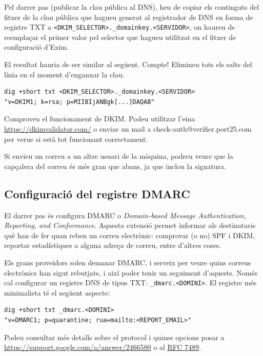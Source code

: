 \documentclass{practicaitic}
\begin{document}
Pel darrer pas (publicar la clau pública al DNS), heu de copiar els continguts
del fitxer de la clau pública que hagueu generat al registrador de DNS en
forma de registre TXT a \texttt{<DKIM\_SELECTOR>.\_domainkey.<SERVIDOR>}, on 
haureu de reemplaçar el primer valor pel selector que hagueu utilitzat en el
fitxer de configuració d'Exim.

El resultat hauria de ser similar al següent. Compte! Elimineu tots els salts
del línia en el moment d'enganxar la clau.

\begin{verbatim}
dig +short txt <DKIM_SELECTOR>._domainkey.<SERVIDOR>
"v=DKIM1; k=rsa; p=MIIBIjANBgk[...]DAQAB"
\end{verbatim}

\begin{tasca}
Comproveu el funcionament de DKIM. Podeu utilitzar l'eina
\url{https://dkimvalidator.com/} o enviar un mail a check-auth@verifier.port25.com
per verue si està tot funcionant correctament.

Si envieu un correu a un altre usuari de la màquina, podreu veure que la capçalera
del correu és més gran que abans, ja que inclou la signatura.
\end{tasca}

\subsection{Configuració del registre DMARC}

El darrer pas és configura DMARC o
\textit{Domain-based Message Authentication, Reporting, and Conformance}.
Aquesta extensió permet informar als destinataris què han de fer quan reben
un correu electrònic: comprovar (o no) SPF i DKIM, reportar estadístiques
a alguna adreça de correu, entre d'altres coses.

Els grans proveïdors solen demanar DMARC, i serveix per veure quins correus
electrònics han sigut rebutjats, i així poder tenir un seguiment d'aquests.
Només cal configurar un registre DNS de tipus TXT: \texttt{\_dmarc.<DOMINI>}.
El registre més minimalista té el següent aspecte:

\begin{verbatim}
dig +short txt _dmarc.<DOMINI>
"v=DMARC1; p=quarantine; rua=mailto:<REPORT_EMAIL>"
\end{verbatim}

Podeu consultar més detalls sobre el protocol i quines opcions posar a
\url{https://support.google.com/a/answer/2466580} o al
\href{https://datatracker.ietf.org/doc/html/rfc7489}{RFC 7489}.
\end{document}
